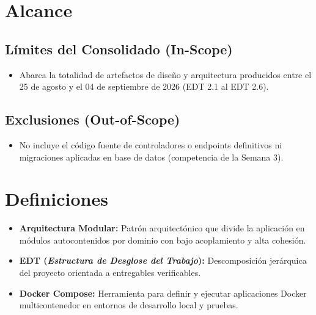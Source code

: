 \documentclass[12pt,a4paper]{article}
\begin{document}
\section{Alcance}

\subsection{Límites del Consolidado (In-Scope)}
\begin{itemize}[leftmargin=1.5em, itemsep=1.5pt]
    \item Abarca la totalidad de artefactos de diseño y arquitectura producidos entre el 25 de agosto y el 04 de septiembre de 2026 (EDT 2.1 al EDT 2.6).
\end{itemize}

\subsection{Exclusiones (Out-of-Scope)}
\begin{itemize}[leftmargin=1.5em, itemsep=1.5pt]
    \item No incluye el código fuente de controladores o endpoints definitivos ni migraciones aplicadas en base de datos (competencia de la Semana 3).
\end{itemize}

\section{Definiciones}
\begin{itemize}[leftmargin=1.5em, itemsep=2pt]
    \item \textbf{Arquitectura Modular:} Patrón arquitectónico que divide la aplicación en módulos autocontenidos por dominio con bajo acoplamiento y alta cohesión.
    \item \textbf{EDT (\textit{Estructura de Desglose del Trabajo}):} Descomposición jerárquica del proyecto orientada a entregables verificables.
    \item \textbf{Docker Compose:} Herramienta para definir y ejecutar aplicaciones Docker multicontenedor en entornos de desarrollo local y pruebas.
\end{itemize}
\end{document}
